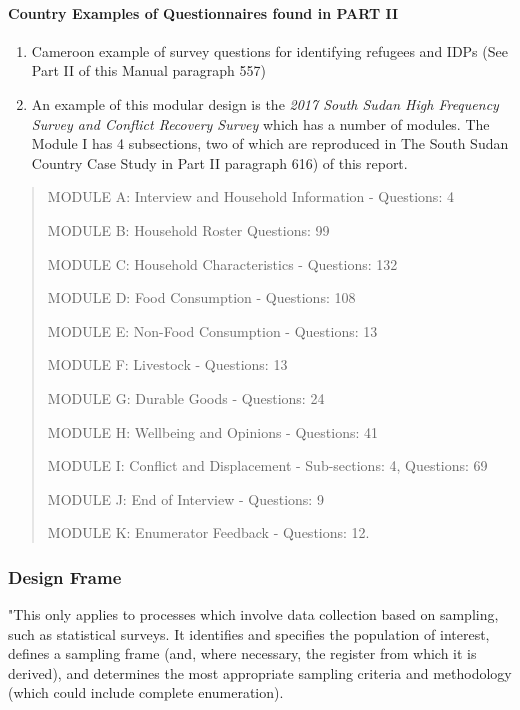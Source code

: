 \documentclass[
]{article}
\begin{document}
\hypertarget{b.3.-country-examples-of-questionnaires-found-in-part-ii}{%
\paragraph{Country Examples of Questionnaires found in PART II}\label{b.3.-country-examples-of-questionnaires-found-in-part-ii}}

\begin{enumerate}
\def\labelenumi{\arabic{enumi}.}
\setcounter{enumi}{128}
\item
  Cameroon example of survey questions for identifying refugees and
  IDPs (See Part II of this Manual paragraph 557)
\item
  An example of this modular design is the \emph{2017 South Sudan High
  Frequency Survey and Conflict Recovery Survey} which has a number of
  modules. The Module I has 4 subsections, two of which are reproduced
  in The South Sudan Country Case Study in Part II paragraph 616) of
  this report.
\end{enumerate}

\begin{quote}
MODULE A: Interview and Household Information - Questions: 4

MODULE B: Household Roster Questions: 99

MODULE C: Household Characteristics - Questions: 132

MODULE D: Food Consumption - Questions: 108

MODULE E: Non-Food Consumption - Questions: 13

MODULE F: Livestock - Questions: 13

MODULE G: Durable Goods - Questions: 24

MODULE H: Wellbeing and Opinions - Questions: 41

MODULE I: Conflict and Displacement - Sub-sections: 4, Questions: 69

MODULE J: End of Interview - Questions: 9

MODULE K: Enumerator Feedback - Questions: 12.
\end{quote}

\hypertarget{design-frame-1}{%
\subsubsection{Design Frame}\label{design-frame-1}}

"This only applies to processes which involve data collection based on
sampling, such as statistical surveys. It identifies and specifies the
population of interest, defines a sampling frame (and, where necessary,
the register from which it is derived), and determines the most
appropriate sampling criteria and methodology (which could include
complete enumeration).
\end{document}
